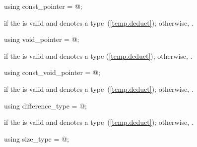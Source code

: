 %
\begin{itemdecl}
using const_pointer = @\seebelow@;
\end{itemdecl}

\begin{itemdescr}
\pnum
\ctype {} if
the   is valid and denotes a
type~(\ref{temp.deduct}); otherwise,
.
\end{itemdescr}

%
\begin{itemdecl}
using void_pointer = @\seebelow@;
\end{itemdecl}

\begin{itemdescr}
\pnum
\ctype {} if
the   is valid and denotes a
type (\ref{temp.deduct}); otherwise,
.
\end{itemdescr}

%
\begin{itemdecl}
using const_void_pointer = @\seebelow@;
\end{itemdecl}

\begin{itemdescr}
\pnum
\ctype {} if
the   is valid and denotes a
type~(\ref{temp.deduct}); otherwise,
.
\end{itemdescr}

%
\begin{itemdecl}
using difference_type = @\seebelow@;
\end{itemdecl}

\begin{itemdescr}
\pnum
\ctype {} if
the   is valid and denotes a
type~(\ref{temp.deduct}); otherwise,
.
\end{itemdescr}

%
\begin{itemdecl}
using size_type = @\seebelow@;
\end{itemdecl}

